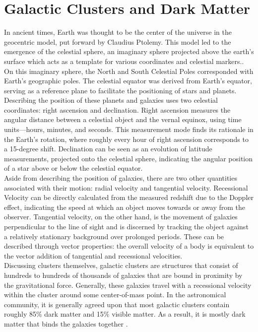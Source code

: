 \documentclass[12pt]{article}
\begin{document}
\section{Galactic Clusters and Dark Matter}
In ancient times, Earth was thought to be the center of the universe in the geocentric model, put forward by Claudius Ptolemy. This model led to the emergence of the celestial sphere, an imaginary sphere projected above the earth's surface which acts as a template for various coordinates and celestial markers.. On this imaginary sphere, the North and South Celestial Poles corresponded with Earth's geographic poles. The celestial equator was derived from Earth’s equator, serving as a reference plane to facilitate the positioning of stars and planets.\\
Describing the position of these planets and galaxies uses two celestial coordinates: right ascension and declination. Right ascension measures the angular distance between a celestial object and the vernal equinox, using time units—hours, minutes, and seconds. This measurement mode finds its rationale in the Earth's rotation, where roughly every hour of right ascension corresponds to a 15-degree shift. Declination can be seen as an evolution of latitude measurements, projected onto the celestial sphere, indicating the angular position of a star above or below the celestial equator.\\
Aside from describing the position of galaxies, there are two other quantities associated with their motion: radial velocity and tangential velocity. Recessional Velocity can be directly calculated from the measured redshift due to the Doppler effect, indicating the speed at which an object moves towards or away from the observer. Tangential velocity, on the other hand, is the movement of galaxies perpendicular to the line of sight and is discerned by tracking the object against a relatively stationary background over prolonged periods. These can be described through vector properties: the overall velocity of a body is equivalent to the vector addition of tangential and recessional velocities.\\
Discussing clusters themselves, galactic clusters are structures that consist of hundreds to hundreds of thousands of galaxies that are bound in proximity by the gravitational force. Generally, these galaxies travel with a recessional velocity within the cluster around some center-of-mass point. In the astronomical community, it is generally agreed upon that most galactic clusters contain roughly 85\% dark matter and 15\% visible matter. As a result, it is mostly dark matter that binds the galaxies together \cite{DarkMatter}.  
\end{document}
